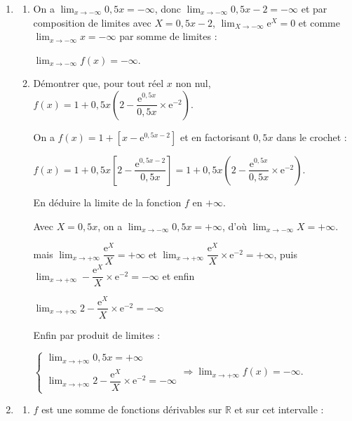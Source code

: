 \documentclass[10pt]{article}
\providecommand{\R}{\mathbb{R}}
\begin{document}
\begin{enumerate}
\item 
	\begin{enumerate}
		\item 
On a $\displaystyle\lim_{x \to - \infty} 0,5x = - \infty$, donc $\displaystyle\lim_{x \to - \infty} 0,5x - 2 = - \infty$ et par composition de limites avec $X = 0,5x - 2$, $\displaystyle\lim_{X \to - \infty} \text{e}^X = 0$ et comme $\displaystyle\lim_{x \to - \infty} x = - \infty$ par somme de limites :

$\displaystyle\lim_{x \to - \infty} f(x) = - \infty$.
		\item Démontrer que, pour tout réel $x$ non nul, $f(x) = 1+ 0,5x\left(2 - \dfrac{\text{e}^{0,5x}}{0,5x} \times \text{e}^{-2}\right)$.

On a $f(x) = 1 + \left[x - \text{e}^{0,5x - 2}\right]$ et en factorisant $0,5x$ dans le crochet :

$f(x)  = 1 + 0,5x\left[2 - \dfrac{\text{e}^{0,5x - 2}}{0,5x} \right] =  1+ 0,5x\left(2 - \dfrac{\text{e}^{0,5x}}{0,5x} \times \text{e}^{-2}\right)$.

En déduire la limite de la fonction $f$ en $+\infty$.

Avec $X = 0,5x$, on a $\displaystyle\lim_{x \to - \infty}0,5x = + \infty$, d'où $\displaystyle\lim_{x \to - \infty} X = + \infty$.

mais $\displaystyle\lim_{x \to + \infty}\dfrac{\text{e}^X}{X} = + \infty$ et $\displaystyle\lim_{x \to + \infty}\dfrac{\text{e}^X}{X} \times \text{e}^{-2} = + \infty$, puis $\displaystyle\lim_{x \to + \infty}-\dfrac{\text{e}^X}{X} \times \text{e}^{-2} = - \infty$ et enfin

$\displaystyle\lim_{x \to + \infty}2 -\dfrac{\text{e}^X}{X} \times \text{e}^{-2} = - \infty$

Enfin par produit de limites :

$\left\{\begin{array}{l}
\displaystyle\lim_{x \to + \infty} 0,5x = + \infty\\
\displaystyle\lim_{x \to + \infty}2 -\dfrac{\text{e}^X}{X} \times \text{e}^{-2} = - \infty
\end{array}\right. \Rightarrow \displaystyle\lim_{x \to + \infty}f(x) = - \infty$.

	\end{enumerate}
\item 
	\begin{enumerate}
		\item 
$f$ est une somme de fonctions dérivables sur $\R$ et sur cet intervalle :


\end{enumerate}
\end{enumerate}
\end{document}

